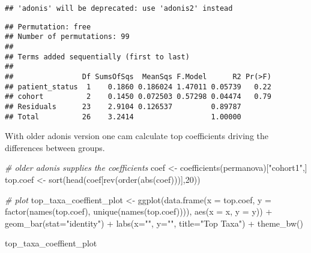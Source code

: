 \documentclass[
  oneside]{book}
\newenvironment{Shaded}{\begin{snugshade}}{\end{snugshade}}
\newcommand{\AttributeTok}[1]{\textcolor[rgb]{0.77,0.63,0.00}{#1}}
\newcommand{\CommentTok}[1]{\textcolor[rgb]{0.56,0.35,0.01}{\textit{#1}}}
\newcommand{\DecValTok}[1]{\textcolor[rgb]{0.00,0.00,0.81}{#1}}
\newcommand{\FunctionTok}[1]{\textcolor[rgb]{0.00,0.00,0.00}{#1}}
\newcommand{\NormalTok}[1]{#1}
\newcommand{\OtherTok}[1]{\textcolor[rgb]{0.56,0.35,0.01}{#1}}
\newcommand{\SpecialCharTok}[1]{\textcolor[rgb]{0.00,0.00,0.00}{#1}}
\newcommand{\StringTok}[1]{\textcolor[rgb]{0.31,0.60,0.02}{#1}}
\begin{document}
\begin{verbatim}
## 'adonis' will be deprecated: use 'adonis2' instead
\end{verbatim}

\begin{Shaded}
\end{Shaded}

\begin{verbatim}
## Permutation: free
## Number of permutations: 99
## 
## Terms added sequentially (first to last)
## 
##                Df SumsOfSqs  MeanSqs F.Model      R2 Pr(>F)
## patient_status  1    0.1860 0.186024 1.47011 0.05739   0.22
## cohort          2    0.1450 0.072503 0.57298 0.04474   0.79
## Residuals      23    2.9104 0.126537         0.89787       
## Total          26    3.2414                  1.00000
\end{verbatim}

With older adonis version one cam calculate top coefficients driving the differences between groups.

\begin{Shaded}
\begin{Highlighting}[]
\CommentTok{\# older adonis supplies the coefficients}
\NormalTok{coef }\OtherTok{\textless{}{-}} \FunctionTok{coefficients}\NormalTok{(permanova)[}\StringTok{"cohort1"}\NormalTok{,]}
\NormalTok{top.coef }\OtherTok{\textless{}{-}} \FunctionTok{sort}\NormalTok{(}\FunctionTok{head}\NormalTok{(coef[}\FunctionTok{rev}\NormalTok{(}\FunctionTok{order}\NormalTok{(}\FunctionTok{abs}\NormalTok{(coef)))],}\DecValTok{20}\NormalTok{))}

\CommentTok{\# plot }
\NormalTok{top\_taxa\_coeffient\_plot }\OtherTok{\textless{}{-}} \FunctionTok{ggplot}\NormalTok{(}\FunctionTok{data.frame}\NormalTok{(}\AttributeTok{x =}\NormalTok{ top.coef,}
                                             \AttributeTok{y =} \FunctionTok{factor}\NormalTok{(}\FunctionTok{names}\NormalTok{(top.coef),}
                                                        \FunctionTok{unique}\NormalTok{(}\FunctionTok{names}\NormalTok{(top.coef)))),}
                                  \FunctionTok{aes}\NormalTok{(}\AttributeTok{x =}\NormalTok{ x, }\AttributeTok{y =}\NormalTok{ y)) }\SpecialCharTok{+}
  \FunctionTok{geom\_bar}\NormalTok{(}\AttributeTok{stat=}\StringTok{"identity"}\NormalTok{) }\SpecialCharTok{+}
  \FunctionTok{labs}\NormalTok{(}\AttributeTok{x=}\StringTok{""}\NormalTok{, }\AttributeTok{y=}\StringTok{""}\NormalTok{, }\AttributeTok{title=}\StringTok{"Top Taxa"}\NormalTok{) }\SpecialCharTok{+}
  \FunctionTok{theme\_bw}\NormalTok{()}

\NormalTok{top\_taxa\_coeffient\_plot}
\end{Highlighting}
\end{Shaded}
\end{document}
